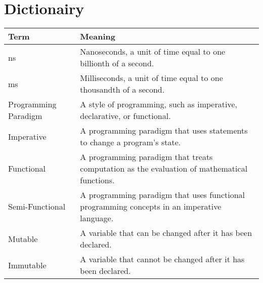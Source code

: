 \onecolumn
\section*{Dictionairy}
\begin{table}[ht]
  \raggedright
  \begin{threeparttable}
    \begin{tabular}{p{4cm}|p{11.5cm}}
      \toprule
      \textbf{Term}   & \textbf{Meaning} \\
      \hline
      ns             & Nanoseconds, a unit of time equal to one billionth of a second. \\
      ms             & Milliseconds, a unit of time equal to one thousandth of a second. \\
      Programming Paradigm & A style of programming, such as imperative, declarative, or functional. \\
      Imperative    & A programming paradigm that uses statements to change a program's state. \\
      Functional    & A programming paradigm that treats computation as the evaluation of mathematical functions. \\
      Semi-Functional & A programming paradigm that uses functional programming concepts in an imperative language. \\
      Mutable       & A variable that can be changed after it has been declared. \\
      Immutable     & A variable that cannot be changed after it has been declared. \\
      \bottomrule
    \end{tabular}
  \end{threeparttable}
\end{table}
\twocolumn
